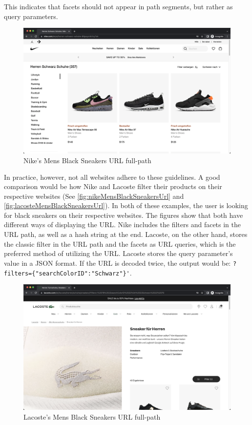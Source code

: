 \noindent This indicates that facets should not appear in path segments, but rather as query parameters.

\begin{figure}[ht!]
  \includegraphics[width=\textwidth]{assets/Nike_Screenshot_2022-08-11_at_11.49.33.png}
  \caption{Nike's Mens Black Sneakers URL full-path}
  \label{fig:nikeMensBlackSneakersUrl}
\end{figure}

In practice, however, not all websites adhere to these guidelines. A good comparison would be how Nike and Lacoste filter their products on their respective websites (See \autoref{fig:nikeMensBlackSneakersUrl} and \autoref{fig:lacosteMensBlackSneakersUrl}). In both of these examples, the user is looking for black sneakers on their respective websites. The figures show that both have different ways of displaying the URL. Nike includes the filters and facets in the URL path, as well as a hash string at the end. Lacoste, on the other hand, stores the classic filter in the URL path and the facets as URL queries, which is the preferred method of utilizing the URL. Lacoste stores the query parameter's value in a JSON format. If the URL is decoded twice, the output would be: \verb;?filters={"searchColorID":"Schwarz"}';.

\begin{figure}[ht!]
  \includegraphics[width=\textwidth]{assets/Lacoste_Screenshot_2022-08-11_at_11.48.10.png}
  \caption{Lacoste's Mens Black Sneakers URL full-path}
  \label{fig:lacosteMensBlackSneakersUrl}
\end{figure}

